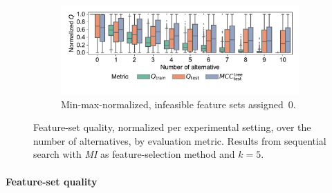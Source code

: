 \documentclass{article}
\theoremstyle{definition}
\begin{document}
\begin{figure}[p]
\begin{subfigure}[t]{\textwidth}
		\label{fig:afs:impact-num-alternatives-quality-min-max}
	\end{subfigure}
	\begin{subfigure}[t]{\textwidth}
		\centering
		\includegraphics[width=\textwidth, trim=15 30 15 15, clip]{plots/impact-num-alternatives-quality-min-max-fillna.pdf}
		\caption{Min-max-normalized, infeasible feature sets assigned~0.}
		\label{fig:afs:impact-num-alternatives-quality-min-max-fillna}
	\end{subfigure}
	\caption{
		Feature-set quality, normalized per experimental setting, over the number of alternatives, by evaluation metric.
		Results from sequential search with \emph{MI} as feature-selection method and $k=5$.
	}
	\label{fig:afs:impact-num-alternatives-quality}
\end{figure}

\paragraph{Feature-set quality}
\end{document}

